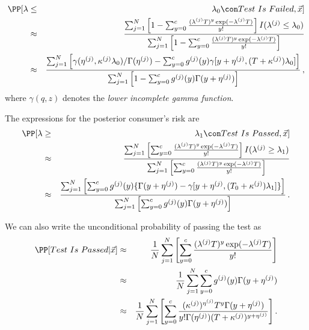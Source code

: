 \documentclass {book}
\begin{document}
\begin{eqnarray*}
\PP[ \lambda & \leq & \lambda_{0} \con Test\mbox{ }Is\mbox{ }Failed,\vec{x}]\\
\mbox{} & \approx & \frac{\sum_{j=1}^{N} \left[1-
\sum^{c}_{y=0}\frac{(\lambda^{(j)} T)^y \exp(-\lambda^{(j)}
T)}{y!} \right]I(\lambda^{(j)} \leq \lambda_0)}{\sum_{j=1}^{N}
\left[ 1- \sum^{c}_{y=0}
\frac{(\lambda^{(j)} T)^y \exp(-\lambda^{(j)} T)}{y!} \right]}\\
\mbox{} & \approx & \frac { \sum^{N}_{j=1} \left[
\gamma(\eta^{(j)},\kappa^{(j)}\lambda_{0})/\Gamma(\eta^{(j)})-
\sum^{c}_{y=0} g^{(j)}(y)
\gamma[y+\eta^{(j)},(T+\kappa^{(j)})\lambda_{0}] \right]}
{\sum^{N}_{j=1} \left[ 1- \sum^{c}_{y=0} g^{(j)}(y)
\Gamma(y+\eta^{(j)})\right] } \, ,
\end{eqnarray*}
where $\gamma(q, z)$ denotes the \emph{lower incomplete gamma
function}.

The expressions for the posterior consumer's
risk are
\begin{eqnarray*}
\PP[\lambda & \geq & \lambda_{1}  \con  Test\mbox{ }Is\mbox{
}Passed, \vec{x} ]\\
\mbox{} & \approx & \frac{\sum_{j=1}^{N} \left[
\sum^{c}_{y=0}\frac{(\lambda^{(j)} T)^y \exp(-\lambda^{(j)}
T)}{y!} \right] I(\lambda^{(j)} \geq \lambda_1)} {\sum_{j=1}^{N}
\left[\sum^{c}_{y=0}
\frac{(\lambda^{(j)} T)^y \exp(-\lambda^{(j)} T)}{y!} \right]}\\
& \approx & \frac { \sum^{N}_{j=1} \left[ \sum^{c}_{y=0}
g^{(j)}(y) \{ \Gamma(y+\eta^{(j)})
-\gamma[y+\eta^{(j)},(T_{0}+\kappa^{(j)})\lambda_{1}] \} \right] }
{ \sum^{N}_{j=1} \left[ \sum^{c}_{y=0} g^{(j)}(y)
\Gamma(y+\eta^{(j)}) \right] } \, .
\end{eqnarray*}

We can also write the unconditional probability of passing the
test as
\begin{eqnarray*}
\PP[ Test \mbox{ }Is \mbox{ }Passed | \vec{x}] & \approx &
\frac{1}{N} \sum_{j=1}^{N} \left[\sum^{c}_{y=0}
\frac{(\lambda^{(j)} T)^y \exp(-\lambda^{(j)} T)}{y!} \right]\\
\mbox{} & \approx & \frac {1}{N} \sum^{N}_{j=1}
\sum^{c}_{y=0} g^{(j)}(y) \Gamma(y+\eta^{(j)})\\
\mbox{} & \approx & \frac {1}{N} \sum^{N}_{j=1}\left[
\sum^{c}_{y=0} \frac
{(\kappa^{(j)})^{\eta^{(j)}}T^{y}\Gamma(y+\eta^{(j)})}{y!
\Gamma(\eta^{(j)})(T+\kappa^{(j)})^{y+\eta^{(j)}}}\right].
\end{eqnarray*}
\end{document}
